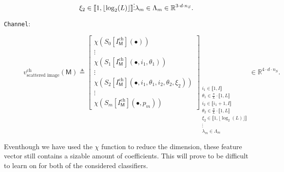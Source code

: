 \begin{description}
\begin{equation}
{{                                    \xi_2 \in \llbracket 1, \lfloor\log_2(L)\rfloor \rrbracket\\
                                    \vdots\\
                                    \lambda_m \in \Lambda_m
                                }
                            } \in \mathbb{R}^{3 \cdot d \cdot n_S}.
                        \end{equation}
                \item[\texttt{Channel}:]
                        \begin{equation}
                            \label{eq::channel_scatnet_image_based_features}
                            v^{\text{ch}}_{\text{scattered image}}\left(\mathsf{M}\right) \triangleq \begin{bmatrix}
                                \chi \left(S_0[I^{\text{ch}}_{\mathsf{M}}]\left(\bullet\right)\right)\\
                                \vdots\\
                                \chi \left(S_1[I^{\text{ch}}_{\mathsf{M}}]\left(\bullet, i_1, \theta_1\right)\right)\\
                                \vdots\\
                                \chi \left(S_2[I^{\text{ch}}_{\mathsf{M}}]\left(\bullet, i_1, \theta_1, i_2, \theta_2, \xi_2\right)\right)\\
                                \vdots\\
                                \chi \left(S_m[I^{\text{ch}}_{\mathsf{M}}]\left(\bullet, p_m\right)\right)
                            \end{bmatrix}_{
                                \substack{
                                    i_1 \in \llbracket 1, I \rrbracket\\
                                    \theta_1 \in \frac{\pi}{L} \cdot \llbracket 1, L \rrbracket\\
                                    i_2 \in \llbracket i_1 + 1, I \rrbracket\\
                                    \theta_2 \in \frac{\pi}{L} \cdot \llbracket 1, L \rrbracket\\
                                    \xi_2 \in \llbracket 1, \lfloor\log_2(L)\rfloor \rrbracket\\
                                    \vdots\\
                                    \lambda_m \in \Lambda_m
                                }
                            } \in \mathbb{R}^{4 \cdot d \cdot n_S}.
                        \end{equation}
            \end{description}
        
            Eventhough we have used the \(\chi\) function to reduce the dimension, these feature vector still contains a sizable amount of coefficients.
            This will prove to be difficult to learn on for both of the considered classifiers.
